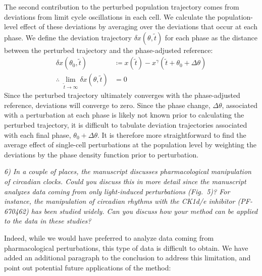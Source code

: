 \documentclass[11pt, letterpaper]{article}
\newenvironment{reviewer}{\itshape\color{gray}}{}
\newenvironment{manuscript}[1]{\begin{center}\begin{tcolorbox}[colback=green!5!white,colframe=green!75!black,width=0.8\textwidth,title={#1},breakable,fonttitle=\bfseries]}{\end{tcolorbox}\end{center}}
\begin{document}
\begin{manuscript}{Pages 12-13}
The second contribution to the perturbed population trajectory comes from deviations from limit cycle oscillations in each cell.
We calculate the population-level effect of these deviations by averaging over the deviations that occur at each phase.
We define the deviation trajectory $\delta x(\theta, \tilde{t})$ for each phase as the distance between the perturbed trajectory and the phase-adjusted reference:
\begin{align}
  \delta x(\theta_0, \tilde{t}) &\coloneqq x(\tilde{t}) - x^\gamma(\tilde{t} + \theta_0 + \Delta \theta)\tag{48} \\
  \therefore\; \lim_{\tilde{t} \to \infty} \delta x(\theta, \tilde{t}) &= 0 \tag{49}
\end{align}
Since the perturbed trajectory ultimately converges with the phase-adjusted reference, deviations will converge to zero.
Since the phase change, $\Delta\theta$, associated with a perturbation at each phase is likely not known prior to calculating the perturbed trajectory, it is difficult to tabulate deviation trajectories associated with each final phase, $\theta_0 + \Delta\theta$.
It is therefore more straightforward to find the average effect of single-cell perturbations at the population level by weighting the deviations by the phase density function prior to perturbation.
\end{manuscript}

\begin{reviewer}
6) In a couple of places, the manuscript discusses pharmacological manipulation of circadian clocks.
Could you discuss this in more detail since the manuscript analyzes data coming from only light-induced perturbations (Fig.~5)? 
For instance, the manipulation of circadian rhythms with the CK1d/e inhibitor (PF-670462) has been studied widely.
Can you discuss how your method can be applied to the data in these studies?
\end{reviewer}

Indeed, while we would have preferred to analyze data coming from pharmacological perturbations, this type of data is difficult to obtain.
We have added an additional paragraph to the conclusion to address this limitation, and point out potential future applications of the method:
\end{document}
